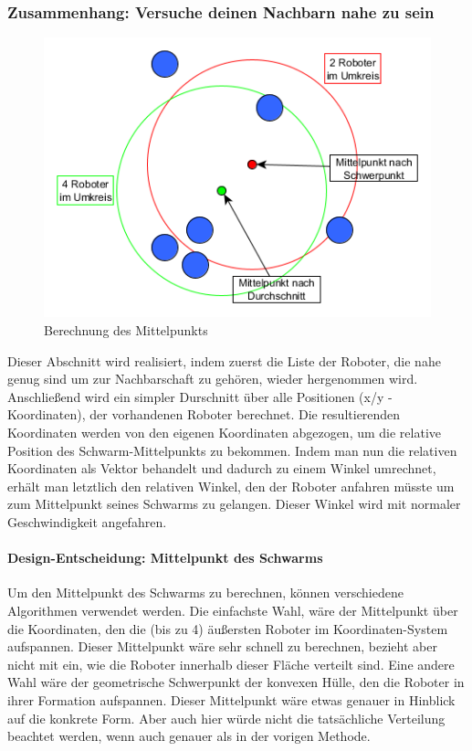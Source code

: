 \subsubsection*{Zusammenhang: Versuche deinen Nachbarn nahe zu sein}

\begin{figure}
	\includegraphics[width=\pictureWidthBig,keepaspectratio]{graphics/SchwarmMittelpunktBerechnung.png}
	\caption{Berechnung des Mittelpunkts}
	\label{pic:BerechnungMittelpunkt}
\end{figure}

Dieser Abschnitt wird realisiert, indem zuerst die Liste der Roboter, die nahe genug sind um zur Nachbarschaft zu gehören, wieder hergenommen wird. Anschließend wird ein simpler Durschnitt über alle Positionen (x/y - Koordinaten), der vorhandenen Roboter berechnet. Die resultierenden Koordinaten werden von den eigenen Koordinaten abgezogen, um die relative Position des Schwarm-Mittelpunkts zu bekommen. Indem man nun die relativen Koordinaten als Vektor behandelt und dadurch zu einem Winkel umrechnet, erhält man letztlich den relativen Winkel, den der Roboter anfahren müsste um zum Mittelpunkt seines Schwarms zu gelangen. Dieser Winkel wird mit normaler Geschwindigkeit angefahren.

\paragraph*{Design-Entscheidung: Mittelpunkt des Schwarms}
Um den Mittelpunkt des Schwarms zu berechnen, können verschiedene Algorithmen verwendet werden. Die einfachste Wahl, wäre der Mittelpunkt über die Koordinaten, den die (bis zu 4) äußersten Roboter im Koordinaten-System aufspannen. Dieser Mittelpunkt wäre sehr schnell zu berechnen, bezieht aber nicht mit ein, wie die Roboter innerhalb dieser Fläche verteilt sind.
Eine andere Wahl wäre der geometrische Schwerpunkt der konvexen Hülle, den die Roboter in ihrer Formation aufspannen. Dieser Mittelpunkt wäre etwas genauer in Hinblick auf die konkrete Form. Aber auch hier würde nicht die tatsächliche Verteilung beachtet werden, wenn auch genauer als in der vorigen Methode.

